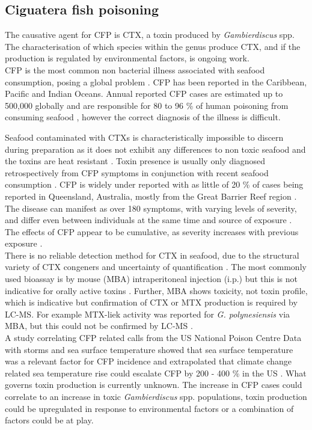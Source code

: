 \documentclass[12pt]{article}
\begin{document}
\subsection{Ciguatera fish poisoning}
The causative agent for CFP is CTX, a toxin produced by \emph{Gambierdiscus} spp. The characterisation of which species within the genus produce CTX, and if the production is regulated by environmental factors, is ongoing work.\\
CFP is the most common non bacterial illness associated with seafood consumption, posing a global problem \cite{friedman2008ciguatera}. CFP has been reported in the Caribbean, Pacific and Indian Oceans. %
Annual reported CFP cases are estimated up to 500,000 globally and are responsible for 80 to 96 \% of human poisoning from consuming seafood \cite{fleming1998seafood,grandjean2008centers}, however the correct diagnosis of the illness is difficult. 

Seafood contaminated with CTXs is characteristically impossible to discern during preparation as it does not exhibit any differences to non toxic seafood and the toxins are heat resistant \cite{withers1982ciguatera}. Toxin presence is usually only diagnosed retrospectively from CFP symptoms in conjunction with recent seafood consumption \cite{sims1987theoretical}. CFP is widely under reported with as little of 20 \% of cases being reported  in Queensland, Australia, mostly from the Great Barrier Reef region \cite{lewis2006ciguatera}. The disease can manifest as over 180 symptoms, with varying levels of severity, and differ even between individuals at the same time and source of exposure \cite{sims1987theoretical}. The effects of CFP appear to be cumulative, as severity increases with previous exposure \cite{emerson1983preliminary}.  \\
There is no reliable detection method for CTX in seafood, due to the structural variety of CTX congeners and uncertainty of quantification \cite{dickey2010ciguatera}. The most commonly used bioassay is by mouse (MBA) intraperitoneal injection (i.p.) but this is not indicative for orally active toxins \cite{botana2014seafood}. Further, MBA shows toxicity, not toxin profile, which is indicative but confirmation of CTX or MTX production is required by LC-MS. For example MTX-liek activity was reported for \emph{G. polynesiensis} via MBA, but this could not be confirmed by LC-MS \cite{chinain1999morphology,rhodes2014production}. \\

A study correlating CFP related calls from the US National Poison Centre Data with storms and sea surface temperature showed that sea surface temperature was a relevant factor for CFP incidence and extrapolated that climate change related sea temperature rise could escalate CFP by 200 - 400 \% in the US \cite{garces2012habitat}. What governs toxin production is currently unknown. The increase in CFP cases could correlate to an increase in toxic \emph{Gambierdiscus} spp. populations, toxin production could be upregulated in response to environmental factors or a combination of factors could be at play.\\ %
\end{document}
